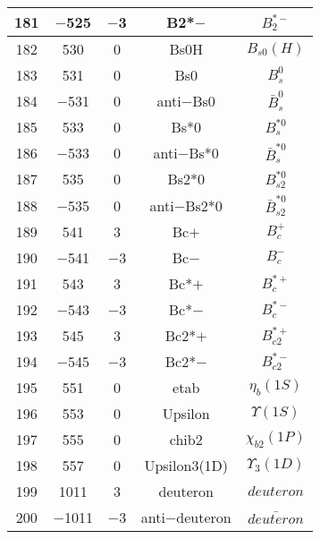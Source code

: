 \documentclass{article}
\begin{document}
\begin{table}[!htbp]
\begin{tabular}{|c|c|c|c|c|}
\hline
181 & $-$525 & $-$3 & B\underline{\hspace{0.6em}}2*$-$ & $B_{2}^{*-}$ \\
\hline
182 & 530 & 0 & B\underline{\hspace{0.6em}}s0H & $B_{s0}(H)$ \\
\hline
183 & 531 & 0 & B\underline{\hspace{0.6em}}s0 & $B_{s}^{0}$ \\
\hline
184 & $-$531 & 0 & anti$-$B\underline{\hspace{0.6em}}s0 & $\bar{B}_{s}^{0}$ \\
\hline
185 & 533 & 0 & B\underline{\hspace{0.6em}}s*0 & $B_{s}^{*0}$ \\
\hline
186 & $-$533 & 0 & anti$-$B\underline{\hspace{0.6em}}s*0 & $\bar{B}_{s}^{*0}$ \\
\hline
187 & 535 & 0 & B\underline{\hspace{0.6em}}s2*0 & $B_{s2}^{*0}$ \\
\hline
188 & $-$535 & 0 & anti$-$B\underline{\hspace{0.6em}}s2*0 & $\bar{B}_{s2}^{*0}$ \\
\hline
189 & 541 & 3 & B\underline{\hspace{0.6em}}c$+$ & $B_{c}^{+}$ \\
\hline
190 & $-$541 & $-$3 & B\underline{\hspace{0.6em}}c$-$ & $B_{c}^{-}$ \\
\hline
191 & 543 & 3 & B\underline{\hspace{0.6em}}c*$+$ & $B_{c}^{*+}$ \\
\hline
192 & $-$543 & $-$3 & B\underline{\hspace{0.6em}}c*$-$ & $B_{c}^{*-}$ \\
\hline
193 & 545 & 3 & B\underline{\hspace{0.6em}}c2*$+$ & $B_{c2}^{*+}$ \\
\hline
194 & $-$545 & $-$3 & B\underline{\hspace{0.6em}}c2*$-$ & $B_{c2}^{*-}$ \\
\hline
195 & 551 & 0 & eta\underline{\hspace{0.6em}}b & $\eta_{b}(1S)$ \\
\hline
196 & 553 & 0 & Upsilon & $\Upsilon(1S)$ \\
\hline
197 & 555 & 0 & chi\underline{\hspace{0.6em}}b2 & $\chi_{b2}(1P)$ \\
\hline
198 & 557 & 0 & Upsilon\underline{\hspace{0.6em}}3(1D) & $\Upsilon_{3}(1D)$ \\
\hline
199 & 1011 & 3 & deuteron & $deuteron$ \\
\hline
200 & $-$1011 & $-$3 & anti$-$deuteron & $\bar{deuteron}$ \\
\hline
\end{tabular}
\end{table}
\end{document}

